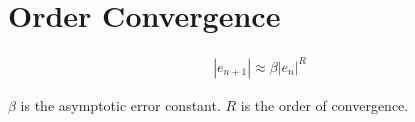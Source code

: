 \section{Order Convergence}

	\begin{align}
		|e_{n+1}| \approx \beta |e_{n}|^{R}
		\label{eq:orderconvergence}
	\end{align}

	$\beta$ is the asymptotic error constant. $R$ is the order of convergence.